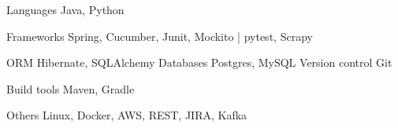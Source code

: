 

\begin{cvskills}

  \cvskill
    {Languages} %
    {Java, Python} %

  \cvskill
    {Frameworks}
    {Spring, Cucumber, Junit, Mockito | pytest, Scrapy}
    
  \cvskill
    {ORM}
    {Hibernate, SQLAlchemy}
  \cvskill
    {Databases}
    {Postgres, MySQL}
  \cvskill
    {Version control} %
    {Git} %
    
  \cvskill
    {Build tools} %
    {Maven, Gradle} %

  \cvskill
  	{Others} {Linux, Docker, AWS, REST, JIRA, Kafka}
\end{cvskills}
